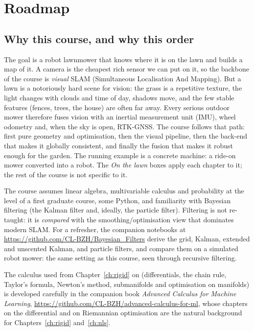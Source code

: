 \chapter*{Roadmap}

\section*{Why this course, and why this order}

The goal is a robot lawnmower that knows where it is on the lawn and builds
a map of it. A camera is the cheapest rich sensor we can put on it, so the
backbone of the course is \emph{visual} SLAM (Simultaneous Localisation And
Mapping). But a lawn is a notoriously hard scene for vision: the grass is a
repetitive texture, the light changes with clouds and time of day, shadows
move, and the few stable features (fences, trees, the house) are often far
away. Every serious outdoor mower therefore fuses vision with an inertial
measurement unit (IMU), wheel odometry and, when the sky is open, RTK-GNSS.
The course follows that path: first pure geometry and optimisation, then the
visual pipeline, then the back-end that makes it globally consistent, and
finally the fusion that makes it robust enough for the garden. The running
example is a concrete machine: a ride-on mower converted into a
robot. The \emph{On the lawn} boxes apply each chapter
to it; the rest of the course is not specific to it.

The course assumes linear algebra, multivariable calculus and probability
at the level of a first graduate course, some Python, and familiarity with
Bayesian filtering (the Kalman filter and, ideally, the particle filter).
Filtering is not re-taught: it is \emph{compared} with the
smoothing/optimisation view that dominates modern SLAM. For a refresher,
the companion notebooks at \url{https://github.com/CL-BZH/Bayesian_Filters}
derive the grid, Kalman, extended and unscented Kalman, and particle
filters, and compare them on a simulated robot mower: the same setting as
this course, seen through recursive filtering.

The calculus used from Chapter~\ref{ch:rigid} on (differentials, the chain
rule, Taylor's formula, Newton's method, submanifolds and optimisation on
manifolds) is developed carefully in the companion book
\emph{Advanced Calculus for Machine Learning},
\url{https://github.com/CL-BZH/advanced-calculus-for-ml}, whose
chapters on the differential and on Riemannian optimisation are the
natural background for Chapters~\ref{ch:rigid} and~\ref{ch:nls}.

